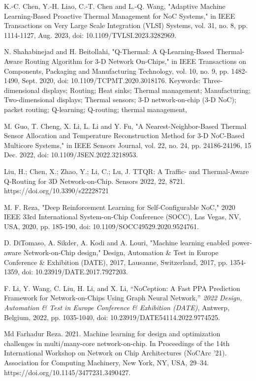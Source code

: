 \documentclass[conference]{IEEEtran}
\begin{document}
\begin{thebibliography}{00}

K.-C. Chen, Y.-H. Liao, C.-T. Chen and L.-Q. Wang, "Adaptive Machine Learning-Based Proactive Thermal Management for NoC Systems," in IEEE Transactions on Very Large Scale Integration (VLSI) Systems, vol. 31, no. 8, pp. 1114-1127, Aug. 2023, doi: 10.1109/TVLSI.2023.3282969.

N. Shahabinejad and H. Beitollahi, "Q-Thermal: A Q-Learning-Based Thermal-Aware Routing Algorithm for 3-D Network On-Chips," in IEEE Transactions on Components, Packaging and Manufacturing Technology, vol. 10, no. 9, pp. 1482-1490, Sept. 2020, doi: 10.1109/TCPMT.2020.3018176. Keywords: {Three-dimensional displays; Routing; Heat sinks; Thermal management; Manufacturing; Two-dimensional displays; Thermal sensors; 3-D network-on-chip (3-D NoC); packet routing; Q-learning; Q-routing; thermal management}, 

M. Guo, T. Cheng, X. Li, L. Li and Y. Fu, "A Nearest-Neighbor-Based Thermal Sensor Allocation and Temperature Reconstruction Method for 3-D NoC-Based Multicore Systems," in IEEE Sensors Journal, vol. 22, no. 24, pp. 24186-24196, 15 Dec. 2022, doi: 10.1109/JSEN.2022.3218953.

Liu, H.; Chen, X.; Zhao, Y.; Li, C.; Lu, J. TTQR: A Traffic- and Thermal-Aware Q-Routing for 3D Network-on-Chip. Sensors 2022, 22, 8721. https://doi.org/10.3390/s22228721

M. F. Reza, "Deep Reinforcement Learning for Self-Configurable NoC," 2020 IEEE 33rd International System-on-Chip Conference (SOCC), Las Vegas, NV, USA, 2020, pp. 185-190, doi: 10.1109/SOCC49529.2020.9524761.

D. DiTomaso, A. Sikder, A. Kodi and A. Louri, "Machine learning enabled power-aware Network-on-Chip design," Design, Automation \& Test in Europe Conference \& Exhibition (DATE), 2017, Lausanne, Switzerland, 2017, pp. 1354-1359, doi: 10.23919/DATE.2017.7927203.

F. Li, Y. Wang, C. Liu, H. Li, and X. Li, ``NoCeption: A Fast PPA Prediction Framework for Network-on-Chips Using Graph Neural Network,'' \emph{2022 Design, Automation \& Test in Europe Conference \& Exhibition (DATE)}, Antwerp, Belgium, 2022, pp. 1035-1040, doi: 10.23919/DATE54114.2022.9774525.

Md Farhadur Reza. 2021. Machine learning for design and optimization challenges in multi/many-core network-on-chip. In Proceedings of the 14th International Workshop on Network on Chip Architectures (NoCArc '21). Association for Computing Machinery, New York, NY, USA, 29–34. https://doi.org/10.1145/3477231.3490427.


\end{thebibliography}
\end{document}
